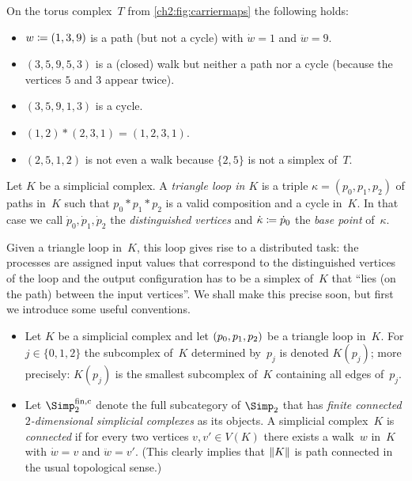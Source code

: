 \begin{thExample}
    On the torus complex~$T$ from \cref{ch2:fig:carriermaps} the following
    holds:
    \begin{itemize}
        \item
            $w \coloneqq (1,3,9)$ is a path (but not a cycle) with
            $\dot w = 1$ and $\ddot w = 9$.
        \item
            $(3,5,9,5,3)$ is a (closed) walk but neither a path nor a cycle
            (because the vertices $5$ and $3$ appear twice).
        \item
            $(3,5,9,1,3)$ is a cycle.
\pagebreak[3] %
        \item
            $(1,2) \ast (2,3,1) = (1,2,3,1)$.
        \item
            $(2,5,1,2)$ is not even a walk because $\{2,5\}$ is not a simplex
            of~$T$.
    \end{itemize}
\end{thExample}

\pagebreak[2]
\begin{thDef}
    Let $K$ be a simplicial complex.
    A \emph{triangle loop in $K$} is a triple $\kappa = (p_0,p_1,p_2)$ of paths
    in~$K$ such that $p_0\ast p_1\ast p_2$ is a valid composition and a cycle
    in~$K$. In that case we call $\dot{p}_0,\dot{p}_1,\dot{p}_2$ the
    \emph{distinguished vertices} and $\dot\kappa \coloneqq \dot{p}_0$ the
    \emph{base point} of~$\kappa$.
\end{thDef}

Given a triangle loop in~$K$, this loop gives rise to a distributed task:
the processes are assigned input values that correspond to the distinguished
vertices of the loop and the output configuration has to be a simplex of~$K$
that \enquote{lies (on the path) between the input vertices}. We shall make this
precise soon, but first we introduce some useful conventions.

\begin{thConvention}\hfill
    \begin{itemize}
        \item
            Let $K$ be a simplicial complex and let $(p_0,p_1,p_2)$ be a triangle loop
            in~$K$. For $j\in\{0,1,2\}$ the subcomplex of~$K$ determined
            by~$p_j$ is denoted $K(p_j)$; more precisely: $K(p_j)$ is the
            smallest subcomplex of~$K$ containing all edges of~$p_j$.
            
        \item
            Let $\finSimp$ denote the full subcategory of $\Simp_2$ that has
            \emph{finite connected $2$-dimensional simplicial complexes} as its
            objects. A simplicial complex~$K$ is \emph{connected} if for
            every two vertices $v,v'\in V(K)$ there exists a walk~$w$ in~$K$
            with $\dot w = v$ and $\ddot w = v'$. (This clearly implies that
            $\lVert K\rVert$ is path connected in the usual topological sense.)
    \end{itemize}
\end{thConvention}

